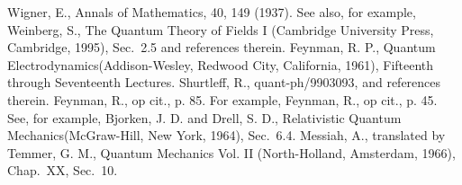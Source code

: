 \documentclass[a4paper,12pt]{article}
\begin{document}
\begin{thebibliography}{9}
 Wigner, E., Annals of Mathematics, 40, 149 (1937). See also, for example, Weinberg, S., The Quantum Theory of Fields I (Cambridge University Press, Cambridge, 1995), Sec.~2.5 and references therein.
 Feynman, R. P., Quantum Electrodynamics(Addison-Wesley, Redwood City, California, 1961), Fifteenth through Seventeenth Lectures.
 Shurtleff, R., quant-ph/9903093, and references therein.
 Feynman, R., op cit., p. 85.
 For example, Feynman, R., op cit., p. 45.
 See, for example, Bjorken, J. D. and Drell, S. D., Relativistic Quantum Mechanics(McGraw-Hill, New York, 1964), Sec.~6.4.
 Messiah, A., translated by Temmer, G. M., Quantum Mechanics Vol. II (North-Holland, Amsterdam, 1966), Chap.~XX, Sec.~10.

\end{thebibliography}
\end{document}
